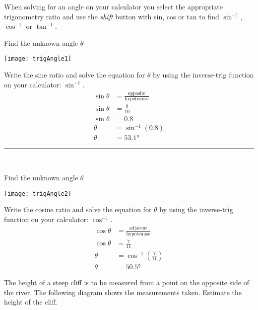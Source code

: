 When solving for an angle on your calculator you select the appropriate trigonometry ratio and use the \emph{shift} button with sin, cos or tan to find $\sin ^{ -1}$, $\cos ^{ -1}$ or $\tan ^{ -1}$. 
\begin{multicols}{2}
	\example Find the unknown angle $\theta$\\
	\begin{center}
		\texttt{[image: trigAngle1]}
	\end{center}
	
	\columnbreak
	\solution Write the sine ratio and solve the equation for $\theta$ by using the inverse-trig function on your calculator: $\sin^{-1}$.\\
	\begin{align*}
	\sin\theta &=\frac{\text{opposite}}{\text{hypotenuse}}\\
	\sin \theta &= \frac{8}{10}\\
	\sin\theta&=0.8\\
	\theta&=\sin^{-1}(0.8)\\
	\theta&=\ang{53.1}
	\end{align*}
\end{multicols}\vspace{-0.5cm}
\rule{6.8cm}{0.5pt}\\
\begin{multicols}{2}
	\example Find the unknown angle $\theta$\\
	\begin{center}
		\texttt{[image: trigAngle2]}
	\end{center}
	\columnbreak
	\solution Write the cosine ratio and solve the equation for $\theta$ by using the inverse-trig function on your calculator: $\cos^{-1}$.
	\begin{align*}
	\cos\theta &=\frac{\text{adjacent}}{\text{hypotenuse}}\\
	\cos \theta &= \frac{7}{11}\\
	\theta&=\cos^{-1} \left(\frac{7}{11}\right)\\
	\theta&=\ang{50.5}
	\end{align*}
\end{multicols}\vspace{-0.5cm}
\example The height of a steep cliff is to be measured from a point on the opposite side of the river. The following diagram shows the measurements taken. Estimate the height of the cliff.
